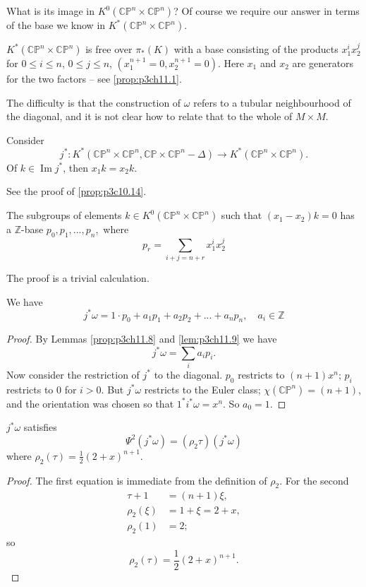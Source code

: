 \documentclass[../main]{subfiles}
\begin{document}
What is its image in $K^0(\mathbb{CP}^n\times\mathbb{CP}^n)$? Of course we require our answer in terms of the base we know in $K^\ast (\mathbb{CP}^n\times\mathbb{CP}^n)$.
\begin{proposition} \label{prop:p3ch11.7}
$K^\ast (\mathbb{CP}^n\times\mathbb{CP}^n)$ is free over $\pi_\ast (K)$ with a base consisting of the products $x_1^ix_2^j$ for $0\leq i \leq n$, $0\leq j\leq n$, $(x_1^{n+1}=0, x_2^{n+1}=0)$. Here $x_1$ and $x_2$ are generators for the two factors -- see \ref{prop:p3ch11.1}.
\end{proposition}
\par The difficulty is that the construction of $\omega$ refers to a tubular neighbourhood of the diagonal, and it is not clear how to relate that to the whole of $M\times M$. 
\begin{lemma} \label{prop:p3ch11.8}
Consider \[j^\ast :K^\ast (\mathbb{CP}^n \times \mathbb{CP}^n, \mathbb{CP}\times \mathbb{CP}^n - \Delta) \longrightarrow K^\ast (\mathbb{CP}^n\times \mathbb{CP}^n).\]
Of $k\in\operatorname{Im}j^\ast $, then $x_1 k = x_2 k$.
\end{lemma}
See the proof of \ref{prop:p3c10.14}.
\begin{lemma} \label{lem:p3ch11.9}
The subgroups of elements $k\in K^0(\mathbb{CP}^n\times \mathbb{CP}^n)$ such that $(x_1-x_2)k=0$ has a $\mathbb{Z}$-base $p_0,p_1,...,p_n,$ where
\[p_r=\sum_{i+j=n+r}x_1^ix_2^j\]
\end{lemma}
\par The proof is a trivial calculation.
\begin{lemma}\label{lem:p3ch11.10}
We have \[j^\ast \omega=1\cdot p_0+a_1p_1+a_2p_2+...+a_np_n, \quad a_i\in \mathbb{Z}\]
\end{lemma}
\begin{proof}
By Lemmas \ref{prop:p3ch11.8} and \ref{lem:p3ch11.9} we have 
\[j^\ast \omega=\sum_ia_ip_i.\]
Now consider the restriction of $j^\ast $ to the diagonal. $p_0$ restricts to $(n+1)x^n$; $p_i$ restricts to $0$ for $i>0$. But $j^\ast \omega$ restricts to the Euler class; $\chi(\mathbb{CP}^n)=(n+1)$, and the orientation was chosen so that $1^\ast i^\ast \omega = x^n$. So $a_0=1$.
\end{proof}
\begin{lemma}\label{lem:p3ch11.11}
$j^\ast \omega$ satisfies
\[\Psi^2(j^\ast \omega)=(\rho_2\tau)(j^\ast \omega)\]
where $\rho_2(\tau)=\frac{1}{2}(2+x)^{n+1}$.
\end{lemma}
\begin{proof}
The first equation is immediate from the definition of $\rho_2$. For the second 
\begin{align}
\tau + 1 &= (n+1)\xi, \nonumber \\
\rho_2(\xi) &= 1+\xi = 2+x, \nonumber \\
\rho_2(1)&=2 \nonumber;
\end{align}
so \[\rho_2(\tau)=\frac{1}{2}(2+x)^{n+1}.\]
\end{proof}
\end{document}
